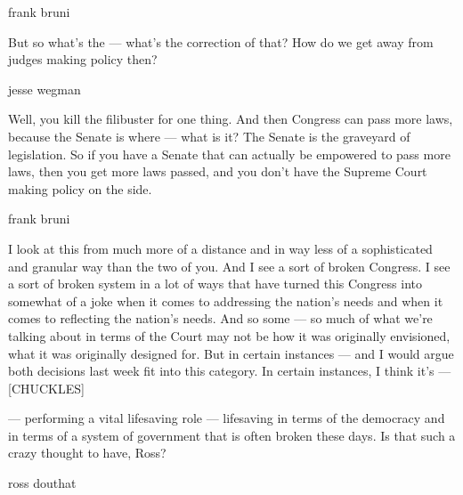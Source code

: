 frank bruni

But so what's the --- what's the correction of that? How do we get away
from judges making policy then?

jesse wegman

Well, you kill the filibuster for one thing. And then Congress can pass
more laws, because the Senate is where --- what is it? The Senate is the
graveyard of legislation. So if you have a Senate that can actually be
empowered to pass more laws, then you get more laws passed, and you
don't have the Supreme Court making policy on the side.

frank bruni

I look at this from much more of a distance and in way less of a
sophisticated and granular way than the two of you. And I see a sort of
broken Congress. I see a sort of broken system in a lot of ways that
have turned this Congress into somewhat of a joke when it comes to
addressing the nation's needs and when it comes to reflecting the
nation's needs. And so some --- so much of what we're talking about in
terms of the Court may not be how it was originally envisioned, what it
was originally designed for. But in certain instances --- and I would
argue both decisions last week fit into this category. In certain
instances, I think it's --- {[}CHUCKLES{]}

--- performing a vital lifesaving role --- lifesaving in terms of the
democracy and in terms of a system of government that is often broken
these days. Is that such a crazy thought to have, Ross?

ross douthat

